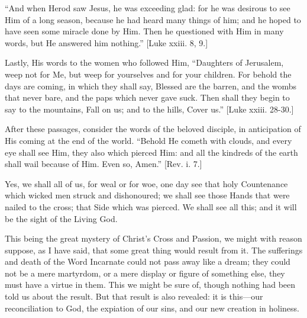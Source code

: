 ``And when Herod saw Jesus, he was exceeding glad: for he was
desirous to see Him of a long season, because he had heard many things
of him; and he hoped to have seen some miracle done by Him. Then he
questioned with Him in many words, but He answered him nothing.''
[Luke xxiii. 8, 9.]

Lastly, His words to the women who followed Him, ``Daughters of
Jerusalem, weep not for Me, but weep for yourselves and for your
children. For behold the days are coming, in which they shall say,
Blessed are the barren, and the wombs that never bare, and the paps
which never gave suck. Then shall they begin to say to the mountains,
Fall on us; and to the hills, Cover us.'' [Luke xxiii. 28-30.]

After these passages, consider the words of the beloved disciple, in
anticipation of His coming at the end of the world. ``Behold He
cometh with clouds, and every eye shall see Him, they also which pierced
Him: and all the kindreds of the earth shall wail because of Him. Even
so, Amen.'' [Rev. i. 7.]

Yes, we shall all of us, for weal or for woe, one day see that holy
Countenance which wicked men struck and dishonoured; we shall see those
Hands that were nailed to the cross; that Side which was pierced. We
shall see all this; and it will be the sight of the Living God.

This being the great mystery of Christ's Cross and Passion, we might
with reason suppose, as I have said, that some great thing would result
from it. The sufferings and death of the Word Incarnate could not pass
away like a dream; they could not be a mere martyrdom, or a mere display
or figure of something else, they must have a virtue in them. This we
might be sure of, though nothing had been told us about the result. But
that result is also revealed: it is this—our reconciliation to God,
the expiation of our sins, and our new creation in holiness.

